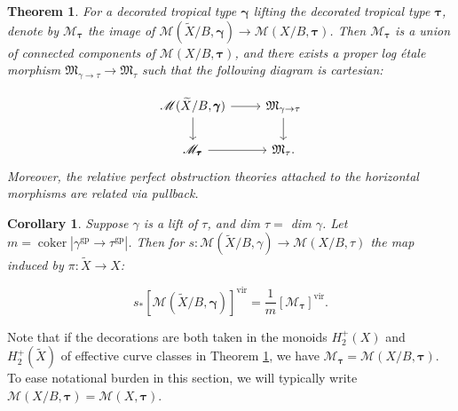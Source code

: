 \documentclass[12pt, oneside]{amsart}   	%
\newcounter{thm}
\newtheorem{theorem}[thm]{Theorem}
\newtheorem{lemma}[thm]{Lemma}
\newtheorem{corollary}[thm]{Corollary}
\newcommand{\vir}{\operatorname{vir}}
\newcommand{\gp}{\operatorname{gp}}
\newcommand{\coker}{\operatorname{coker}}
\numberwithin{equation}{section}
\numberwithin{thm}{section}
\numberwithin{figure}{section}
\begin{document}
\begin{theorem}\label{decthm}
For a decorated tropical type $\pmb\gamma$ lifting the decorated tropical type $\pmb \tau$, denote by $\mathscr{M}_{\pmb\tau}$ the image of $\mathscr{M}(\widetilde{X}/B,\pmb\gamma) \rightarrow \mathscr{M}(X/B,\pmb\tau)$. Then $\mathscr{M}_{\pmb\tau}$ is a union of connected components of $\mathscr{M}(X/B,\pmb\tau)$, and there exists a proper log \'etale morphism $\mathfrak{M}_{\gamma\rightarrow \tau} \rightarrow \mathfrak{M}_{\tau}$ such that the following diagram is cartesian:

\begin{equation}\label{cart}
\begin{tikzcd}
\mathscr{M}(\widetilde{X}/B,\pmb\gamma) \arrow{r} \arrow{d} & \mathfrak{M}_{\gamma \rightarrow \tau} \arrow{d} \\
\mathscr{M}_{\pmb\tau} \arrow{r} & \mathfrak{M}_{\tau}.
\end{tikzcd}
\end{equation}
Moreover, the relative perfect obstruction theories attached to the horizontal morphisms are related via pullback.
\end{theorem}



\begin{corollary}\label{puncmcr1}
Suppose $\gamma$ is a lift of $\tau$, and dim $\tau =$ dim $\gamma$. Let $m = \coker|\gamma^{\gp} \rightarrow \tau^{\gp}|$. Then for $s: \mathscr{M}(\widetilde{X}/B,\gamma) \rightarrow \mathscr{M}(X/B,\tau)$ the map induced by $\pi: \widetilde{X} \rightarrow X$: 

\[s_*[\mathscr{M}(\widetilde{X}/B,\pmb\gamma)]^{\vir} = \frac{1}{m}[\mathscr{M}_{\pmb\tau}]^{\vir} .\] 
\end{corollary}
Note that if the decorations are both taken in the monoids $H_2^+(X)$ and $H_2^+(\widetilde{X})$ of effective curve classes in Theorem \ref{decthm}, we have $\mathscr{M}_{\pmb\tau}  =\mathscr{M}(X/B,\pmb\tau)$. To ease notational burden in this section, we will typically write $\mathscr{M}(X/B,\pmb\tau) = \mathscr{M}(X,\pmb\tau)$. 





\end{document}
